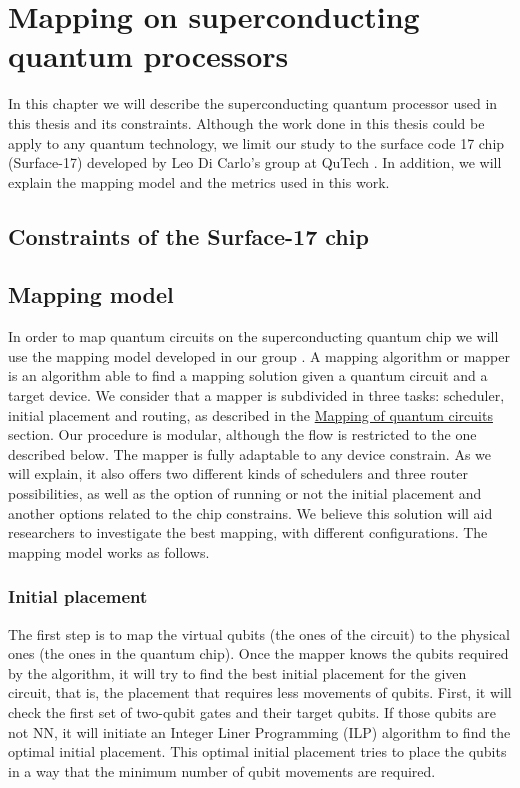 

\chapter{Mapping on superconducting quantum processors}
\label{sec:org0c87802}

In this chapter we will describe the superconducting quantum processor used in this thesis and its constraints. 
Although the work done in this thesis  could be apply to any quantum technology, we limit our study to the surface code 17 chip (Surface-17) developed by Leo Di Carlo's group at QuTech \cite{Versluis_2017}.
In addition, we will explain the mapping model and the metrics used in this work.

\section{Constraints of the Surface-17 chip}
\label{sec:org168a66d}


\section{Mapping model}
\label{sec:org19dc500}
In order to map quantum circuits on the superconducting quantum chip we will use the mapping model developed in our group \cite{Lao_2018}.
A mapping algorithm or mapper is an algorithm able to find a mapping solution given a quantum circuit and a target device.
We consider that a mapper is subdivided in three tasks: scheduler, initial placement and routing, as described in the \hyperref[sec:orgd680d43]{Mapping of quantum circuits} section.
Our procedure is modular, although the flow is restricted to the one described below.
The mapper is fully adaptable to any device constrain.
As we will explain, it also offers two different kinds of schedulers and three router possibilities, as well as the option of running or not the initial placement and another options related to the chip constrains.
We believe this solution will aid researchers to investigate the best mapping, with different configurations.
The mapping model works as follows.

\subsection{Initial placement}
\label{sec:org4fe48f6}

The first step is to map the virtual qubits (the ones of the circuit) to the physical ones (the ones in the quantum chip).
Once the mapper knows the qubits required by the algorithm, it will try to find the best initial placement for the given circuit, that is, the placement that requires less movements of qubits.
First, it will check the first set of two-qubit gates and their target qubits.
If those qubits are not NN, it will initiate an Integer Liner Programming (ILP) algorithm \cite{Lao_2018} to find the optimal initial placement.
This optimal initial placement tries to place the qubits in a way that the minimum number of qubit movements are required.



